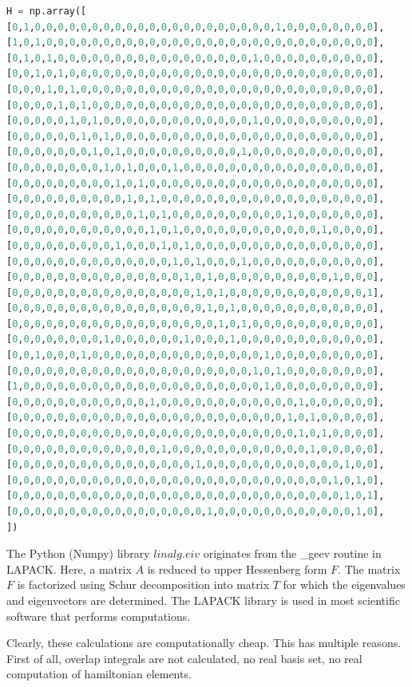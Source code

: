 \documentclass{article}
\begin{document}
\begin{lstlisting}[language=Python,caption={Matrix of the resonance integrals of the Hamiltonian of motor 2},label={lst:hamiltonian_mm2}]
H = np.array([
[0,1,0,0,0,0,0,0,0,0,0,0,0,0,0,0,0,0,0,0,0,0,0,1,0,0,0,0,0,0,0,0], 
[1,0,1,0,0,0,0,0,0,0,0,0,0,0,0,0,0,0,0,0,0,0,0,0,0,0,0,0,0,0,0,0], 
[0,1,0,1,0,0,0,0,0,0,0,0,0,0,0,0,0,0,0,0,0,1,0,0,0,0,0,0,0,0,0,0], 
[0,0,1,0,1,0,0,0,0,0,0,0,0,0,0,0,0,0,0,0,0,0,0,0,0,0,0,0,0,0,0,0], 
[0,0,0,1,0,1,0,0,0,0,0,0,0,0,0,0,0,0,0,0,0,0,0,0,0,0,0,0,0,0,0,0], 
[0,0,0,0,1,0,1,0,0,0,0,0,0,0,0,0,0,0,0,0,0,0,0,0,0,0,0,0,0,0,0,0], 
[0,0,0,0,0,1,0,1,0,0,0,0,0,0,0,0,0,0,0,0,0,1,0,0,0,0,0,0,0,0,0,0], 
[0,0,0,0,0,0,1,0,1,0,0,0,0,0,0,0,0,0,0,0,0,0,0,0,0,0,0,0,0,0,0,0], 
[0,0,0,0,0,0,0,1,0,1,0,0,0,0,0,0,0,0,0,0,1,0,0,0,0,0,0,0,0,0,0,0], 
[0,0,0,0,0,0,0,0,1,0,1,0,0,0,1,0,0,0,0,0,0,0,0,0,0,0,0,0,0,0,0,0], 
[0,0,0,0,0,0,0,0,0,1,0,1,0,0,0,0,0,0,0,0,0,0,0,0,0,0,0,0,0,0,0,0], 
[0,0,0,0,0,0,0,0,0,0,1,0,1,0,0,0,0,0,0,0,0,0,0,0,0,0,0,0,0,0,0,0], 
[0,0,0,0,0,0,0,0,0,0,0,1,0,1,0,0,0,0,0,0,0,0,0,0,1,0,0,0,0,0,0,0], 
[0,0,0,0,0,0,0,0,0,0,0,0,1,0,1,0,0,0,0,0,0,0,0,0,0,0,0,1,0,0,0,0], 
[0,0,0,0,0,0,0,0,0,1,0,0,0,1,0,1,0,0,0,0,0,0,0,0,0,0,0,0,0,0,0,0], 
[0,0,0,0,0,0,0,0,0,0,0,0,0,0,1,0,1,0,0,0,1,0,0,0,0,0,0,0,0,0,0,0], 
[0,0,0,0,0,0,0,0,0,0,0,0,0,0,0,1,0,1,0,0,0,0,0,0,0,0,0,0,1,0,0,0], 
[0,0,0,0,0,0,0,0,0,0,0,0,0,0,0,0,1,0,1,0,0,0,0,0,0,0,0,0,0,0,0,1], 
[0,0,0,0,0,0,0,0,0,0,0,0,0,0,0,0,0,1,0,1,0,0,0,0,0,0,0,0,0,0,0,0], 
[0,0,0,0,0,0,0,0,0,0,0,0,0,0,0,0,0,0,1,0,1,0,0,0,0,0,0,0,0,0,0,0], 
[0,0,0,0,0,0,0,0,1,0,0,0,0,0,0,1,0,0,0,1,0,0,0,0,0,0,0,0,0,0,0,0], 
[0,0,1,0,0,0,1,0,0,0,0,0,0,0,0,0,0,0,0,0,0,0,1,0,0,0,0,0,0,0,0,0], 
[0,0,0,0,0,0,0,0,0,0,0,0,0,0,0,0,0,0,0,0,0,1,0,1,0,0,0,0,0,0,0,0], 
[1,0,0,0,0,0,0,0,0,0,0,0,0,0,0,0,0,0,0,0,0,0,1,0,0,0,0,0,0,0,0,0], 
[0,0,0,0,0,0,0,0,0,0,0,0,1,0,0,0,0,0,0,0,0,0,0,0,0,1,0,0,0,0,0,0], 
[0,0,0,0,0,0,0,0,0,0,0,0,0,0,0,0,0,0,0,0,0,0,0,0,1,0,1,0,0,0,0,0], 
[0,0,0,0,0,0,0,0,0,0,0,0,0,0,0,0,0,0,0,0,0,0,0,0,0,1,0,1,0,0,0,0], 
[0,0,0,0,0,0,0,0,0,0,0,0,0,1,0,0,0,0,0,0,0,0,0,0,0,0,1,0,0,0,0,0], 
[0,0,0,0,0,0,0,0,0,0,0,0,0,0,0,0,1,0,0,0,0,0,0,0,0,0,0,0,0,1,0,0], 
[0,0,0,0,0,0,0,0,0,0,0,0,0,0,0,0,0,0,0,0,0,0,0,0,0,0,0,0,1,0,1,0], 
[0,0,0,0,0,0,0,0,0,0,0,0,0,0,0,0,0,0,0,0,0,0,0,0,0,0,0,0,0,1,0,1], 
[0,0,0,0,0,0,0,0,0,0,0,0,0,0,0,0,0,1,0,0,0,0,0,0,0,0,0,0,0,0,1,0], 
])
\end{lstlisting}

The Python (Numpy) library $linalg.eiv$ originates from the \_geev routine in LAPACK. Here, a matrix $A$ is reduced to upper Hessenberg form $F$. The matrix $F$ is factorized using Schur decomposition into matrix $T$ for which the eigenvalues and eigenvectors are determined. The LAPACK library is used in most scientific software that performs computations. 

Clearly, these calculations are computationally cheap. This has multiple reasons. First of all, overlap integrals are not calculated, no real basis set, no real computation of hamiltonian elements.

\clearpage

               
    
\end{document}
